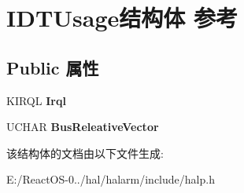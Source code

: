 \hypertarget{struct_i_d_t_usage}{}\section{I\+D\+T\+Usage结构体 参考}
\label{struct_i_d_t_usage}
\subsection*{Public 属性}
\begin{DoxyCompactItemize}
\item 
\mbox{\label{struct_i_d_t_usage_ab75c58b8071953e1373b1caa313372ea}} 
K\+I\+R\+QL {\bfseries Irql}
\item 
\mbox{\label{struct_i_d_t_usage_a76e959d02f76c0bbf4d2401ccf6dcf0f}} 
U\+C\+H\+AR {\bfseries Bus\+Releative\+Vector}
\end{DoxyCompactItemize}


该结构体的文档由以下文件生成\+:\begin{DoxyCompactItemize}
\item 
E\+:/\+React\+O\+S-\/0../hal/halarm/include/halp.\+h\end{DoxyCompactItemize}
